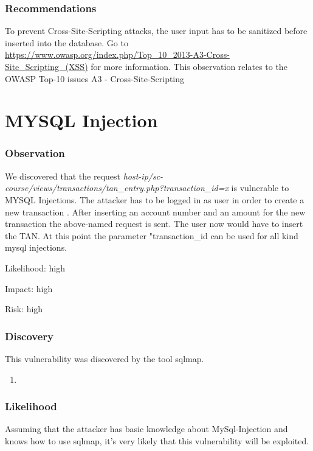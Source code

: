 \documentclass{article}
\begin{document}
\section*{Recommendations}
To prevent Cross-Site-Scripting attacks, the user input has to be sanitized before inserted into the database. Go to \url{https://www.owasp.org/index.php/Top_10_2013-A3-Cross-Site_Scripting_(XSS)} for more information. \newline
This observation relates to the OWASP Top-10 issues A3 - Cross-Site-Scripting


\part*{MYSQL Injection}

\section*{Observation}

We discovered that the request \textit{host-ip/sc-course/views/transactions/tan\_entry.php?transaction\_id=x} is vulnerable to MYSQL Injections.
The attacker has to be logged in as user in order to create a new transaction . After inserting an account number and an amount for the new transaction the above-named request is sent. The user now would have to insert the TAN. At this point the parameter "transaction\_id can be used for all kind mysql  injections.


Likelihood: high\newline

Impact:      	high\newline

Risk: high \newline

\section*{Discovery}
This vulnerability was discovered by the tool sqlmap. 
\begin{enumerate}
\item {}
\end{enumerate}



\section*{Likelihood}
Assuming that the attacker has basic knowledge about MySql-Injection and knows how to use sqlmap, it's very likely that this vulnerability will be exploited.
\end{document}
